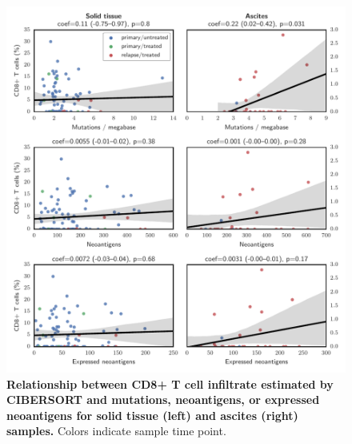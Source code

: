 \documentclass{article}
\begin{document}
\begin{figure}[htbp]
\centering
\includegraphics[scale=1.0]{../figures/cd8_vs_muts.pdf}
\caption{\textbf{Relationship between CD8+ T cell infiltrate estimated by CIBERSORT and mutations, neoantigens, or expressed neoantigens for solid tissue (left) and ascites (right) samples.} Colors indicate sample time point.}
\label{fig:cd8vsmuts}
\end{figure}


\newpage
\FloatBarrier

 

\end{document}
